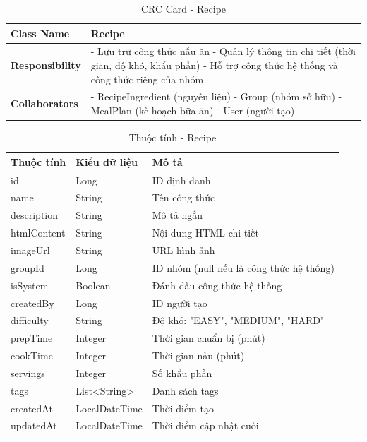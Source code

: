 \begin{table}[H]
\small
\renewcommand{\arraystretch}{1.3}
\begin{tabularx}{\textwidth}{|>{\raggedright\arraybackslash}p{3.5cm}|X|}
\hline
\rowcolor{gray!20}
\textbf{Class Name} & Recipe \\
\hline
\textbf{Responsibility} & - Lưu trữ công thức nấu ăn \newline - Quản lý thông tin chi tiết (thời gian, độ khó, khẩu phần) \newline - Hỗ trợ công thức hệ thống và công thức riêng của nhóm \\
\hline
\textbf{Collaborators} & - RecipeIngredient (nguyên liệu) \newline - Group (nhóm sở hữu) \newline - MealPlan (kế hoạch bữa ăn) \newline - User (người tạo) \\
\hline
\end{tabularx}
\caption{CRC Card - Recipe}
\end{table}

\begin{table}[H]
\small
\renewcommand{\arraystretch}{1.3}
\begin{tabularx}{\textwidth}{|>{\raggedright\arraybackslash}p{3cm}|>{\raggedright\arraybackslash}p{3cm}|X|}
\hline
\rowcolor{gray!20}
\textbf{Thuộc tính} & \textbf{Kiểu dữ liệu} & \textbf{Mô tả} \\
\hline
id & Long & ID định danh \\
\hline
name & String & Tên công thức \\
\hline
description & String & Mô tả ngắn \\
\hline
htmlContent & String & Nội dung HTML chi tiết \\
\hline
imageUrl & String & URL hình ảnh \\
\hline
groupId & Long & ID nhóm (null nếu là công thức hệ thống) \\
\hline
isSystem & Boolean & Đánh dấu công thức hệ thống \\
\hline
createdBy & Long & ID người tạo \\
\hline
difficulty & String & Độ khó: "EASY", "MEDIUM", "HARD" \\
\hline
prepTime & Integer & Thời gian chuẩn bị (phút) \\
\hline
cookTime & Integer & Thời gian nấu (phút) \\
\hline
servings & Integer & Số khẩu phần \\
\hline
tags & List<String> & Danh sách tags \\
\hline
createdAt & LocalDateTime & Thời điểm tạo \\
\hline
updatedAt & LocalDateTime & Thời điểm cập nhật cuối \\
\hline
\end{tabularx}
\caption{Thuộc tính - Recipe}
\end{table}

